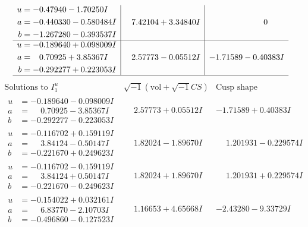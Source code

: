 \documentclass[1p]{elsarticle_modified}
\theoremstyle{definition}
\newcommand{\I}{\sqrt{-1}}
\begin{document}
$$\begin{array}{c|c|c}
\begin{aligned}
u &= -0.47940 - 1.70250 I \\
a &= -0.440330 - 0.580484 I \\
b &= -1.267280 - 0.393537 I\end{aligned}
 & \phantom{-}7.42104 + 3.34840 I & \phantom{-0.000000 } 0 \\ \hline\begin{aligned}
u &= -0.189640 + 0.098009 I \\
a &= \phantom{-}0.70925 + 3.85367 I \\
b &= -0.292277 + 0.223053 I\end{aligned}
 & \phantom{-}2.57773 - 0.05512 I & -1.71589 - 0.40383 I\\
 \hline 
 \end{array}$$\newpage$$\begin{array}{c|c|c}  
\text{Solutions to }I^u_{1}& \I (\text{vol} + \sqrt{-1}CS) & \text{Cusp shape}\\
 \hline 
\begin{aligned}
u &= -0.189640 - 0.098009 I \\
a &= \phantom{-}0.70925 - 3.85367 I \\
b &= -0.292277 - 0.223053 I\end{aligned}
 & \phantom{-}2.57773 + 0.05512 I & -1.71589 + 0.40383 I \\ \hline\begin{aligned}
u &= -0.116702 + 0.159119 I \\
a &= \phantom{-}3.84124 - 0.50147 I \\
b &= -0.221670 + 0.249623 I\end{aligned}
 & \phantom{-}1.82024 - 1.89670 I & \phantom{-}1.201931 - 0.229574 I \\ \hline\begin{aligned}
u &= -0.116702 - 0.159119 I \\
a &= \phantom{-}3.84124 + 0.50147 I \\
b &= -0.221670 - 0.249623 I\end{aligned}
 & \phantom{-}1.82024 + 1.89670 I & \phantom{-}1.201931 + 0.229574 I \\ \hline\begin{aligned}
u &= -0.154022 + 0.032161 I \\
a &= \phantom{-}6.83770 - 2.10703 I \\
b &= -0.496860 - 0.127523 I\end{aligned}
 & \phantom{-}1.16653 + 4.65668 I & -2.43280 - 9.33729 I \\ \hline\begin{aligned}

\end{aligned}
\end{array}$$
\end{document}
